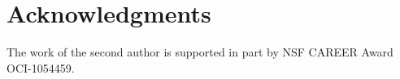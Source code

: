 \section{Acknowledgments}
The work of the second author is supported in part by NSF CAREER Award
OCI-1054459.
